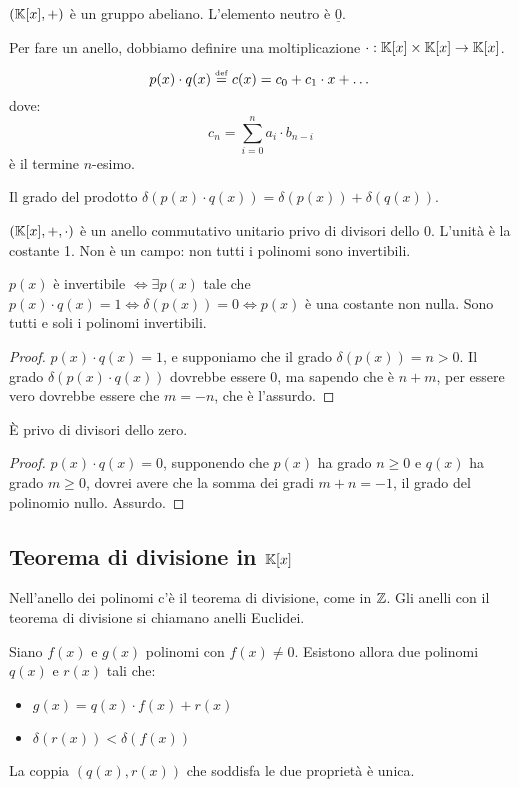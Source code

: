 $(\mathbb{K}[x], +)$ \`e un gruppo abeliano. L'elemento neutro \`e $\underline{0}$.

Per fare un anello, dobbiamo definire una moltiplicazione $\cdot : \mathbb{K}[x] \times \mathbb{K}[x] \to \mathbb{K}[x]$.
\[
p(x) \cdot q(x) \overset{\underset{\mathrm{def}}{}}{=} c(x) = c_0 + c_1 \cdot x + \dots
\]
dove:
\[
c_n = \sum_{i = 0}^{n} a_i \cdot b_{n - i}
\]
\`e il termine $n$-esimo.

Il grado del prodotto $\delta(p(x) \cdot q(x)) = \delta(p(x)) + \delta(q(x))$.

$(\mathbb{K}[x], +, \cdot)$ \`e un anello commutativo unitario privo di divisori dello 0. L'unit\`a \`e la costante 1. Non \`e un campo: non tutti i polinomi sono invertibili.

$p(x)$ \`e invertibile $\iff \exists p(x)$ tale che $p(x) \cdot q(x) = 1 \iff \delta(p(x)) = 0 \iff p(x)$ \`e una costante non nulla. Sono tutti e soli i polinomi invertibili.

\begin{proof}
$p(x) \cdot q(x) = 1$, e supponiamo che il grado $\delta(p(x)) = n > 0$. Il grado $\delta(p(x) \cdot q(x))$ dovrebbe essere 0, ma sapendo che \`e $n + m$, per essere vero dovrebbe essere che $m = -n$, che \`e l'assurdo.
\end{proof}

\`E privo di divisori dello zero.
\begin{proof}
$p(x) \cdot q(x) = 0$, supponendo che $p(x)$ ha grado $n \ge 0$ e $q(x)$ ha grado $m \ge 0$, dovrei avere che la somma dei gradi $m + n = -1$, il grado del polinomio nullo. Assurdo.
\end{proof}

\subsection{Teorema di divisione in $\mathbb{K}[x]$}

Nell'anello dei polinomi c'\`e il teorema di divisione, come in $\mathbb{Z}$. Gli anelli con il teorema di divisione si chiamano anelli Euclidei.

Siano $f(x)$ e $g(x)$ polinomi con $f(x) \neq 0$. Esistono allora due polinomi $q(x)$ e $r(x)$ tali che:
\begin{itemize}
    \item $g(x) = q(x) \cdot f(x) + r(x)$
    \item $\delta(r(x)) < \delta(f(x))$
\end{itemize}

La coppia $(q(x), r(x))$ che soddisfa le due propriet\`a \`e unica.

